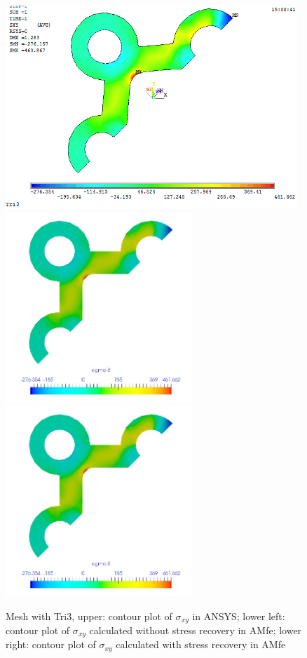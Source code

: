 \begin{figure}[htbp]
	\begin{center}
		\includegraphics[width=11cm,clip]{TTri3_Sxy.png} 	
		\includegraphics[width=7cm,clip]{TTri3_Sxy_PD.png} 		
		\includegraphics[width=7cm,clip]{TTri3_Sxy_P.png} 		
		\caption{Mesh with Tri3, upper: contour plot of $\sigma_{xy}$ in ANSYS; lower left: contour plot of $\sigma_{xy}$ calculated without stress recovery in AMfe; lower right: contour plot of $\sigma_{xy}$ calculated with stress recovery in AMfe} \label{fig: Tri3_Sxy}
	\end{center}
\end{figure}
\clearpage 

